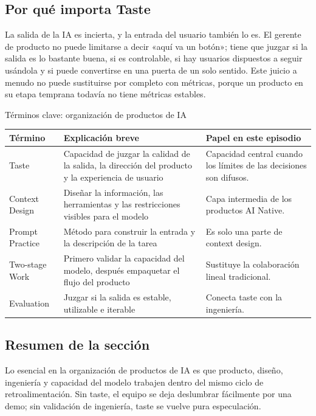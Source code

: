 \documentclass[a4paper]{article}
\begin{document}
\subsection{Por qué importa Taste}

La salida de la IA es incierta, y la entrada del usuario también lo es. El gerente de producto no puede limitarse a decir «aquí va un botón»; tiene que juzgar si la salida es lo bastante buena, si es controlable, si hay usuarios dispuestos a seguir usándola y si puede convertirse en una puerta de un solo sentido. Este juicio a menudo no puede sustituirse por completo con métricas, porque un producto en su etapa temprana todavía no tiene métricas estables.

\begin{knowledgebox}{Términos clave: organización de productos de IA}
\begin{tabularx}{\textwidth}{p{}p{}X}
\toprule
Término & Explicación breve & Papel en este episodio \\
\midrule
Taste & Capacidad de juzgar la calidad de la salida, la dirección del producto y la experiencia de usuario & Capacidad central cuando los límites de las decisiones son difusos. \\
Context Design & Diseñar la información, las herramientas y las restricciones visibles para el modelo & Capa intermedia de los productos AI Native. \\
Prompt Practice & Método para construir la entrada y la descripción de la tarea & Es solo una parte de context design. \\
Two-stage Work & Primero validar la capacidad del modelo, después empaquetar el flujo del producto & Sustituye la colaboración lineal tradicional. \\
Evaluation & Juzgar si la salida es estable, utilizable e iterable & Conecta taste con la ingeniería. \\
\bottomrule
\end{tabularx}
\end{knowledgebox}

\subsection{Resumen de la sección}

Lo esencial en la organización de productos de IA es que producto, diseño, ingeniería y capacidad del modelo trabajen dentro del mismo ciclo de retroalimentación. Sin taste, el equipo se deja deslumbrar fácilmente por una demo; sin validación de ingeniería, taste se vuelve pura especulación.
\end{document}
